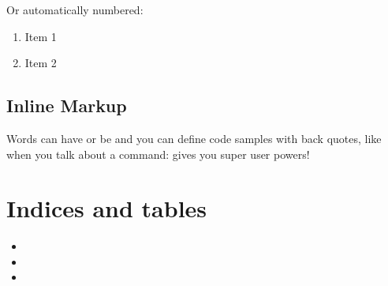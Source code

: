 \documentclass[letterpaper,10pt,english]{sphinxmanual}
\begin{document}
Or automatically numbered:
\begin{enumerate}
%
\item {} 
Item 1

\item {} 
Item 2

\end{enumerate}


\section{Inline Markup}
\label{\detokenize{jobSubmit:inline-markup}}
Words can have  or be  and you can define
code samples with back quotes, like when you talk about a command: 
gives you super user powers!


\chapter{Indices and tables}
\label{\detokenize{index:indices-and-tables}}\begin{itemize}
\item {} 

\item {} 

\item {} 

\end{itemize}



\renewcommand{\indexname}{Index}
\printindex
\end{document}
